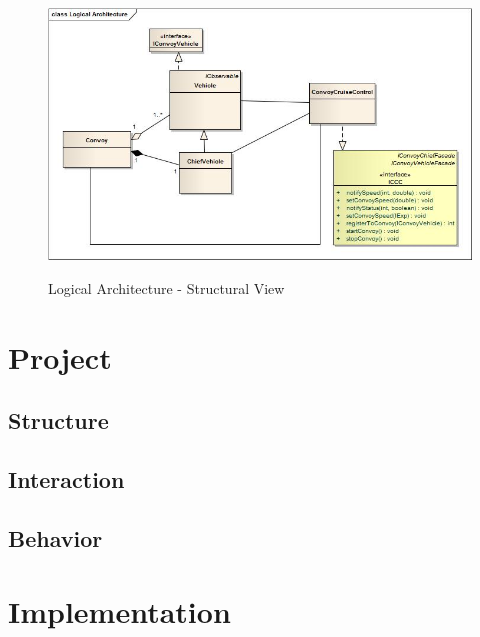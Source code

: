 \documentclass{llncs}
\newcommand{\labelsec}[1]{\label{sec:#1}}
\newcommand{\labelfig}[1]{\label{fig:#1}}
\begin{document}
\begin{figure}
   \centering
   \includegraphics[scale = 0.5]{../Diagrams/Logical_Architecture.jpg}\\
  \caption{Logical Architecture - Structural View}\labelfig{testTypes}
\end{figure}




\newpage

\section{Project}
\labelsec{Project}

\subsection{Structure}
\subsection{Interaction}
\subsection{Behavior}

\section{Implementation}
\labelsec{Implementation}

\end{document}
